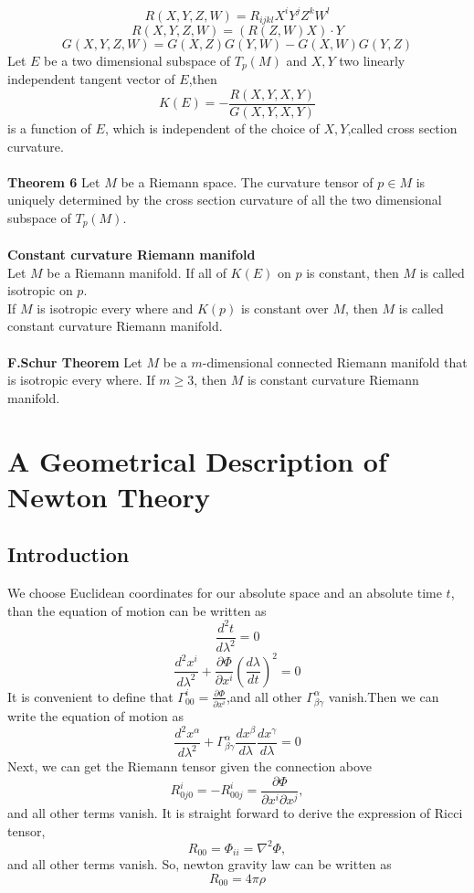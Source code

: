 \documentclass{article}
\begin{document}
\[R(X,Y,Z,W) = R_{ijkl}X^iY^jZ^kW^l\]
\[R(X,Y,Z,W) = (R(Z,W)X) \cdot Y\]
\[G(X,Y,Z,W) = G(X,Z)G(Y,W) - G(X,W)G(Y,Z)\]
Let $E$ be a two dimensional subspace of $T_p(M)$ and $X,Y$ two linearly independent tangent vector of $E$,then
\[K(E) = -\frac{R(X,Y,X,Y)}{G(X,Y,X,Y)}\]
is a function of $E$, which is independent of the choice of $X,Y$,called cross section curvature.\\ \\
\textbf{Theorem 6} Let $M$ be a Riemann space. The curvature tensor of $p \in M$ is uniquely determined by the cross section curvature of all the two dimensional subspace of $T_p(M)$.\\ \\ 
\textbf{Constant curvature Riemann manifold} \\
Let $M$ be a Riemann manifold. If all of $K(E)$ on $p$ is constant, then $M$ is called isotropic on $p$. \\
If $M$ is isotropic every where and $K(p)$ is constant over $M$, then $M$ is called constant curvature Riemann manifold.\\ \\
\textbf{F.Schur Theorem} Let $M$ be a $m$-dimensional connected Riemann manifold that is isotropic every where. If $m \geq 3$, then $M$ is constant curvature Riemann manifold.

\section{A Geometrical Description of Newton Theory}
\subsection{Introduction}
We choose Euclidean coordinates for our absolute space and an absolute time $t$, than the equation of motion can be written as
\[\frac{d^2 t}{d\lambda^2} = 0\]
\[\frac{d^2 x^i}{d\lambda^2} + \frac{\partial \Phi}{\partial x^i} (\frac{d\lambda}{dt})^2=0\]
It is convenient to define that $\Gamma^i_{00} = \frac{\partial \Phi}{\partial x^i}$,and all other $\Gamma^{\alpha}_{\beta \gamma}$ vanish.Then we can write the equation of motion as
\[\frac{d^2 x^{\alpha}}{d\lambda^2} + \Gamma^{\alpha}_{\beta \gamma} \frac{dx^{\beta}}{d \lambda} \frac{dx^{\gamma}}{d \lambda}=0\]
Next, we can get the Riemann tensor given the connection above\[
R^i_{0j0} = -R^i_{00j} = \frac{\partial \Phi}{\partial x^i \partial x^j},
\]and all other terms vanish. It is straight forward to derive the expression of Ricci tensor,
\[R_{00} = \Phi_{ii} = \nabla^2\Phi,\]and all other terms vanish.
So, newton gravity law can be written as
\[R_{00} = 4\pi\rho\]
\end{document}
